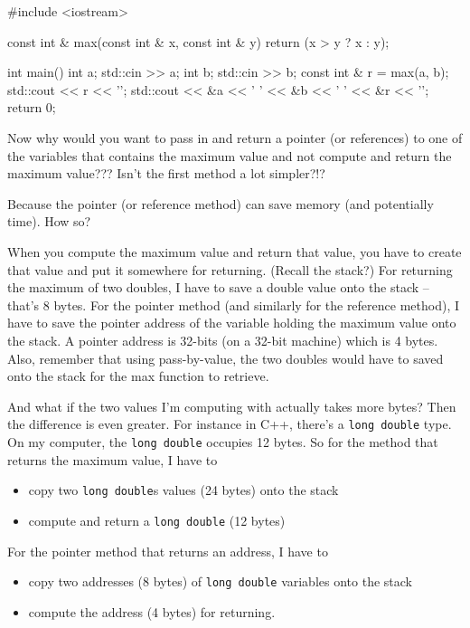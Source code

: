\begin{consolethree}[escapeinside=||]
#include <iostream>

const int & max(const int & x, const int & y)
{
    return (x > y ? x : y);
}

int main()
{
    int a;
    std::cin >> a;
    int b;
    std::cin >> b;
    const int & r = max(a, b);
    std::cout << r << '\n';
    std::cout << &a << ' ' << &b
                    << ' ' << &r << '\n';
    return 0;
}
\end{consolethree}
Now why would you want to pass in and return a pointer (or references) to one of the variables that contains the maximum value and not compute and return the maximum value??? Isn't the first method a lot simpler?!?

Because the pointer (or reference method) can save memory (and potentially time). How so?

When you compute the maximum value and return that value, you have to create that value and put it somewhere for returning. (Recall the stack?) For returning the maximum of two doubles, I have to save a double value onto the stack -- that's 8 bytes. For the pointer method (and similarly for the reference method), I have to save the pointer address of the variable holding the maximum value onto the stack. A pointer address is 32-bits (on a 32-bit machine) which is 4 bytes. Also, remember that using pass-by-value, the two doubles would have to saved onto the stack for the max function to retrieve.

And what if the two values I'm computing with actually takes more bytes?
Then the difference is even greater. For instance in C++, there's a \texttt{long double} type. On my computer, the \texttt{long double} occupies 12 bytes. So for the method that returns the maximum value, I have to

\begin{itemize}

\item
  copy two \texttt{long double}s values (24 bytes) onto the stack
\item
  compute and return a \texttt{long double} (12 bytes)
\end{itemize}

For the pointer method that returns an address, I have to

\begin{itemize}

\item
  copy two addresses (8 bytes) of \texttt{long double} variables onto the stack
\item
  compute the address (4 bytes) for returning.
\end{itemize}

